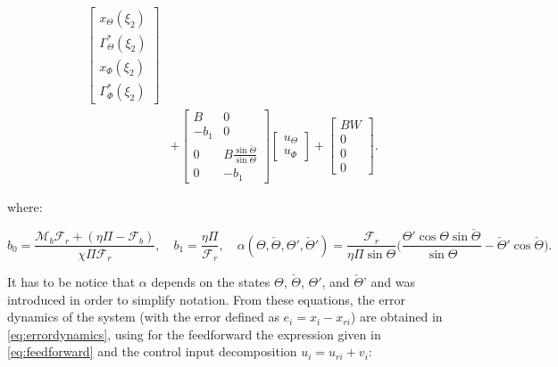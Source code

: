 \documentclass[main.tex]{subfiles}
\begin{document}
\begin{align}
\begin{bmatrix}
	x_\Theta(\xi_2) \\
	\Gamma_\Theta^{*}(\xi_2) \\
	x_\Phi(\xi_2) \\
	\Gamma_\Phi^{*} (\xi_2)
	\end{bmatrix}\nonumber \\ 
	&+
	\begin{bmatrix}
	B & 0 \\
	-b_1 & 0 \\
	0 & B \frac{\sin \check{\Theta}}{\sin \Theta} \\
	0 & -b_1
	\end{bmatrix}
	\begin{bmatrix}
	u_\Theta \\
	u_\Phi
	\end{bmatrix} +
	\begin{bmatrix}
	BW \\
	0 \\
	0 \\
	0
	\end{bmatrix}.
	\end{align}
	
	where:
	
	\begin{equation}
		b_0 = \frac{\mathcal{M}_b \mathcal{F}_r + (\eta \Pi - \mathcal{F}_b)}{\chi \Pi \mathcal{F}_r}, \quad b_1 = \frac{\eta \Pi}{\mathcal{F}_r}, \quad \alpha (\Theta,\check{\Theta},\Theta',\check{\Theta}') = \frac{\mathcal{F}_r}{\eta \Pi \sin \Theta} \bigg( \frac{\Theta' \cos \Theta \sin \check{\Theta}}{\sin \Theta}  - \check{\Theta}' \cos \check{\Theta}\bigg). \nonumber
	\end{equation}
	
	It has to be notice that $\alpha$ depends on the states $\Theta$, $\check{\Theta}$, $\Theta'$, and $\check{\Theta}$' and was introduced in order to simplify notation. From these equations, the error dynamics of the system (with the error defined as $e_i = x_i - x_{ri}$) are obtained in \eqref{eq:errordynamics}, using for the feedforward the expression given in \eqref{eq:feedforward} and the control input decomposition $u_i = u_{ri} + v_i$:
		
\end{document}
